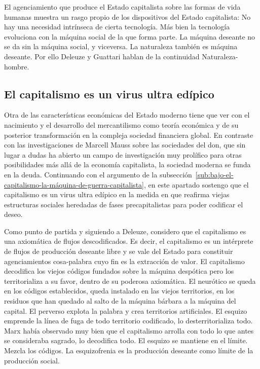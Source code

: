 El agenciamiento que produce el Estado capitalista sobre las formas de vida humanas muestra un rasgo propio de los dispositivos del Estado capitalista: No hay una necesidad intrínseca de cierta tecnología. Más bien la tecnología evoluciona con la máquina social de la que forma parte. La máquina deseante no se da sin la máquina social, y viceversa. La naturaleza también es máquina deseante. Por ello Deleuze y Guattari hablan de la continuidad Naturaleza-hombre.

\subsection{El capitalismo es un virus ultra edípico}
\label{sub:el-capitalismo-es-un-virus-ultra-edípico}

Otra de las características económicas del Estado moderno tiene que ver con el nacimiento y el desarrollo del mercantilismo como teoría económica y de su posterior transformación en la compleja sociedad financiera global. En contraste con las investigaciones de Marcell Mauss sobre las sociedades del don, que sin lugar a dudas ha abierto un campo de investigación muy prolífico para otras posibilidades más allá de la economía capitalista, la sociedad moderna se funda en la deuda. Continuando con el argumento de la subsección~\ref{sub:bajo-el-capitalismo-la-máquina-de-guerra-capitalista}, en este apartado sostengo que el capitalismo es un virus ultra edípico en la medida en que reafirma viejas estructuras sociales heredadas de fases precapitalistas para poder codificar el deseo.

Como punto de partida y siguiendo a Deleuze, considero que el capitalismo es una axiomática de flujos descodificados. Es decir, el capitalismo es un intérprete de flujos de producción deseante libre y se vale del Estado para constituir agenciamientos cosa-palabra cuyo fin es la extracción de valor. El capitalismo decodifica los viejos códigos fundados sobre la máquina despótica pero los territorializa a su favor, dentro de su poderosa axiomática. El neurótico se queda en los códigos establecidos, queda instalado en las viejos territorios, en los residuos que han quedado al salto de la máquina bárbara a la máquina del capital. El perverso explota la palabra y crea territorios artificiales. El esquizo emprende la línea de fuga de todo territorio codificado, lo desterritorializa todo. Marx había observado muy bien que el capitalismo arrolla con todo lo que antes se consideraba sagrado, lo decodifica todo. El esquizo se mantiene en el límite. Mezcla los códigos. La esquizofrenia es la producción deseante como límite de la producción social.


